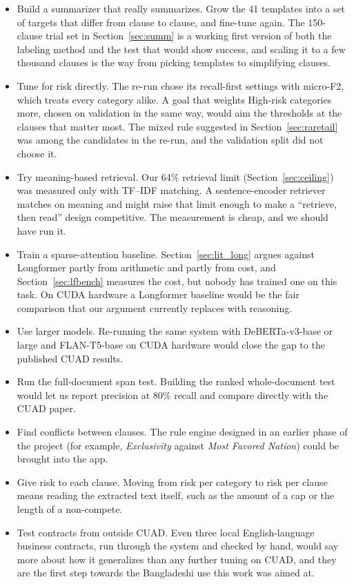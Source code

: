 \begin{itemize}[itemsep=2pt]
  \item Build a summarizer that really summarizes. Grow the 41 templates into a set of targets that differ from clause to clause, and fine-tune again. The 150-clause trial set in Section~\ref{sec:summ} is a working first version of both the labeling method and the test that would show success, and scaling it to a few thousand clauses is the way from picking templates to simplifying clauses.
  \item Tune for risk directly. The re-run chose its recall-first settings with micro-F2, which treats every category alike. A goal that weights High-risk categories more, chosen on validation in the same way, would aim the thresholds at the clauses that matter most. The mixed rule suggested in Section~\ref{sec:raretail} was among the candidates in the re-run, and the validation split did not choose it.
  \item Try meaning-based retrieval. Our 64\% retrieval limit (Section~\ref{sec:ceiling}) was measured only with TF--IDF matching. A sentence-encoder retriever matches on meaning and might raise that limit enough to make a ``retrieve, then read'' design competitive. The measurement is cheap, and we should have run it.
  \item Train a sparse-attention baseline. Section~\ref{sec:lit_long} argues against Longformer partly from arithmetic and partly from cost, and Section~\ref{sec:lfbench} measures the cost, but nobody has trained one on this task. On CUDA hardware a Longformer baseline would be the fair comparison that our argument currently replaces with reasoning.
  \item Use larger models. Re-running the same system with DeBERTa-v3-base or large and FLAN-T5-base on CUDA hardware would close the gap to the published CUAD results.
  \item Run the full-document span test. Building the ranked whole-document test would let us report precision at 80\% recall and compare directly with the CUAD paper.
  \item Find conflicts between clauses. The rule engine designed in an earlier phase of the project (for example, \emph{Exclusivity} against \emph{Most Favored Nation}) could be brought into the app.
  \item Give risk to each clause. Moving from risk per category to risk per clause means reading the extracted text itself, such as the amount of a cap or the length of a non-compete.
  \item Test contracts from outside CUAD. Even three local English-language business contracts, run through the system and checked by hand, would say more about how it generalizes than any further tuning on CUAD, and they are the first step towards the Bangladeshi use this work was aimed at.
\end{itemize}

